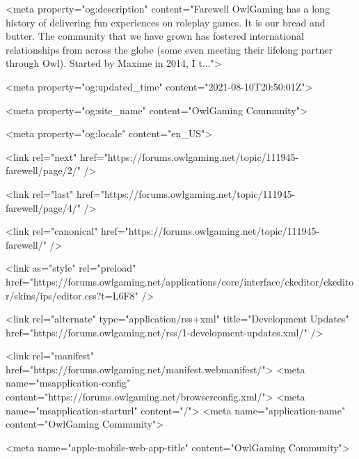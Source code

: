 		
	

	
		
			
				<meta property="og:description" content="Farewell OwlGaming has a long history of delivering fun experiences on roleplay games. It is our bread and butter. The community that we have grown has fostered international relationships from across the globe (some even meeting their lifelong partner through Owl). Started by Maxime in 2014, I t...">
			
		
	

	
		
			
				<meta property="og:updated_time" content="2021-08-10T20:50:01Z">
			
		
	

	
		
			
				<meta property="og:site_name" content="OwlGaming Community">
			
		
	

	
		
			
				<meta property="og:locale" content="en_US">
			
		
	


	
		<link rel="next" href="https://forums.owlgaming.net/topic/111945-farewell/page/2/" />
	

	
		<link rel="last" href="https://forums.owlgaming.net/topic/111945-farewell/page/4/" />
	

	
		<link rel="canonical" href="https://forums.owlgaming.net/topic/111945-farewell/" />
	

	
		<link as="style" rel="preload" href="https://forums.owlgaming.net/applications/core/interface/ckeditor/ckeditor/skins/ips/editor.css?t=L6F8" />
	

<link rel="alternate" type="application/rss+xml" title="Development Updates" href="https://forums.owlgaming.net/rss/1-development-updates.xml/" />


<link rel="manifest" href="https://forums.owlgaming.net/manifest.webmanifest/">
<meta name="msapplication-config" content="https://forums.owlgaming.net/browserconfig.xml/">
<meta name="msapplication-starturl" content="/">
<meta name="application-name" content="OwlGaming Community">

<meta name="apple-mobile-web-app-title" content="OwlGaming Community">

